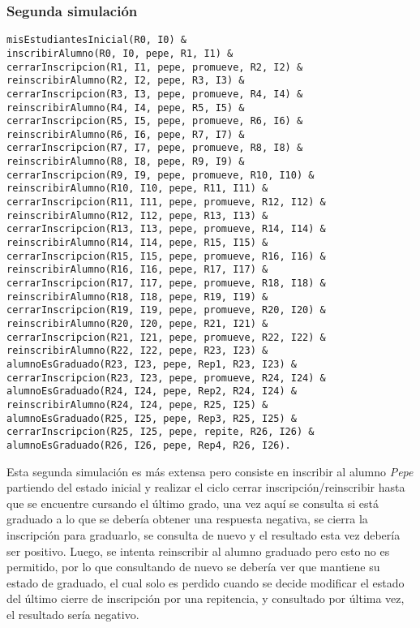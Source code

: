\documentclass{article}
\begin{document}
\subsubsection*{Segunda simulación}
\begin{verbatim}
misEstudiantesInicial(R0, I0) &
inscribirAlumno(R0, I0, pepe, R1, I1) &
cerrarInscripcion(R1, I1, pepe, promueve, R2, I2) &
reinscribirAlumno(R2, I2, pepe, R3, I3) &
cerrarInscripcion(R3, I3, pepe, promueve, R4, I4) &
reinscribirAlumno(R4, I4, pepe, R5, I5) &
cerrarInscripcion(R5, I5, pepe, promueve, R6, I6) &
reinscribirAlumno(R6, I6, pepe, R7, I7) &
cerrarInscripcion(R7, I7, pepe, promueve, R8, I8) &
reinscribirAlumno(R8, I8, pepe, R9, I9) &
cerrarInscripcion(R9, I9, pepe, promueve, R10, I10) &
reinscribirAlumno(R10, I10, pepe, R11, I11) &
cerrarInscripcion(R11, I11, pepe, promueve, R12, I12) &
reinscribirAlumno(R12, I12, pepe, R13, I13) &
cerrarInscripcion(R13, I13, pepe, promueve, R14, I14) &
reinscribirAlumno(R14, I14, pepe, R15, I15) &
cerrarInscripcion(R15, I15, pepe, promueve, R16, I16) &
reinscribirAlumno(R16, I16, pepe, R17, I17) &
cerrarInscripcion(R17, I17, pepe, promueve, R18, I18) &
reinscribirAlumno(R18, I18, pepe, R19, I19) &
cerrarInscripcion(R19, I19, pepe, promueve, R20, I20) &
reinscribirAlumno(R20, I20, pepe, R21, I21) &
cerrarInscripcion(R21, I21, pepe, promueve, R22, I22) &
reinscribirAlumno(R22, I22, pepe, R23, I23) &
alumnoEsGraduado(R23, I23, pepe, Rep1, R23, I23) &
cerrarInscripcion(R23, I23, pepe, promueve, R24, I24) &
alumnoEsGraduado(R24, I24, pepe, Rep2, R24, I24) &
reinscribirAlumno(R24, I24, pepe, R25, I25) &
alumnoEsGraduado(R25, I25, pepe, Rep3, R25, I25) &
cerrarInscripcion(R25, I25, pepe, repite, R26, I26) &
alumnoEsGraduado(R26, I26, pepe, Rep4, R26, I26).
\end{verbatim}

Esta segunda simulación es más extensa pero consiste en inscribir al alumno \emph{Pepe} partiendo del estado inicial y realizar el ciclo cerrar inscripción/reinscribir hasta que se encuentre cursando el último grado, una vez aquí se consulta si está graduado a lo que se debería obtener una respuesta negativa, se cierra la inscripción para graduarlo, se consulta de nuevo y el resultado esta vez debería ser positivo. Luego, se intenta reinscribir al alumno graduado pero esto no es permitido, por lo que consultando de nuevo se debería ver que mantiene su estado de graduado, el cual solo es perdido cuando se decide modificar el estado del último cierre de inscripción por una repitencia, y consultado por última vez, el resultado sería negativo.
\end{document}
